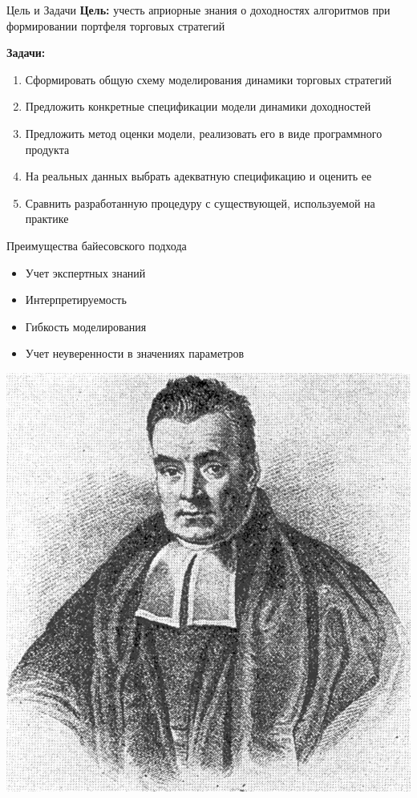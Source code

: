 \documentclass[12pt]{beamer}
\begin{document}
\begin{frame}{Цель и Задачи}
\textbf{Цель:} учесть априорные знания о доходностях алгоритмов при формировании портфеля торговых стратегий

\textbf{Задачи:}
\begin{enumerate}
	\item Сформировать общую схему моделирования динамики торговых стратегий
	\item Предложить конкретные спецификации модели динамики доходностей
	\item Предложить метод оценки модели, реализовать его в виде программного продукта
	\item На реальных данных выбрать адекватную спецификацию и оценить ее
	\item Сравнить разработанную процедуру с существующей, используемой на практике
\end{enumerate}
\end{frame}
\begin{frame}{Преимущества байесовского подхода}
\begin{minipage}{0.6\linewidth}
	\begin{itemize}
		\item Учет экспертных знаний
		\item Интерпретируемость
		\item Гибкость моделирования
		\item Учет неуверенности в значениях параметров
	\end{itemize}
\end{minipage}
\begin{minipage}{0.38\linewidth}
	\includegraphics[width=\linewidth]{bayes}
\end{minipage}
\end{frame}
\end{document}

